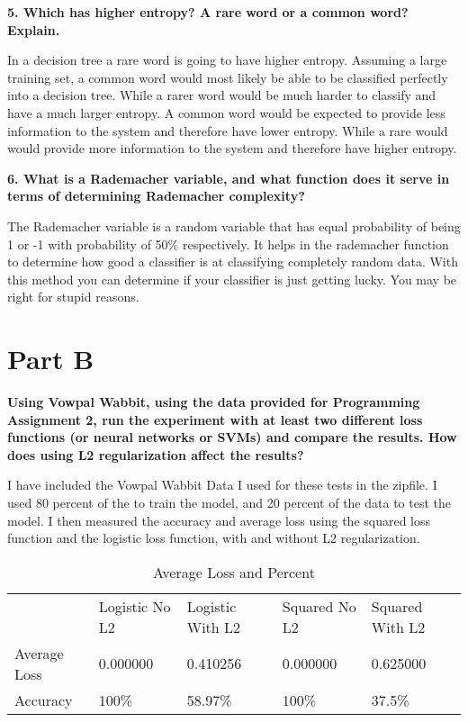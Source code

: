 \documentclass[11pt, oneside]{article}   	%
\begin{document}
\textbf{5. Which has higher entropy? A rare word or a common word? Explain.}

In a decision tree a rare word is going to have higher entropy. Assuming a large training set, a common word would most likely be able to be classified perfectly into a decision tree. While a rarer word would be much harder to classify and have a much larger entropy. A common word would be expected to provide less information to the system and therefore have lower entropy. While a rare would would provide more information to the system and therefore have higher entropy. 

\textbf{6. What is a Rademacher variable, and what function does it serve in terms of determining Rademacher complexity?}

The Rademacher variable is a random variable that has equal probability of being 1 or -1 with probability of 50\% respectively. It helps in the rademacher function to determine how good a classifier is at classifying completely random data. With this method you can determine if your classifier is just getting lucky. You may be right for stupid reasons.

\section*{Part B}

\textbf{Using Vowpal Wabbit, using the data provided for Programming Assignment 2, run the experiment with at least two different loss functions (or neural networks or SVMs) and compare the results. How does using L2 regularization affect the results?}

I have included the Vowpal Wabbit Data I used for these tests in the zipfile. I used 80 percent of the to train the model, and 20 percent of the data to test the model. I then measured the accuracy and average loss using the squared loss function and the logistic loss function, with and without L2 regularization. 
\begin{table}[]
\centering
\caption{Average Loss and Percent}
\label{my-label}
\begin{tabular}{lllll}
             & Logistic No L2 & Logistic With L2 & Squared No L2 & Squared With L2 \\
Average Loss & 0.000000       & 0.410256         & 0.000000      & 0.625000        \\
Accuracy     & 100\%          & 58.97\%          & 100\%         & 37.5\%         
\end{tabular}
\end{table}
\end{document}

